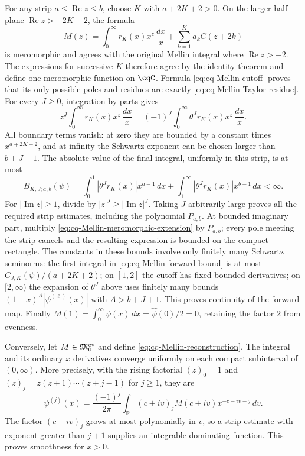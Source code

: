 For any strip $a\leq\operatorname{Re}z\leq b$, choose $K$
with $a+2K+2>0$. On the larger half-plane
$\operatorname{Re}z>-2K-2$, the formula
\begin{equation}\label{eq:cq-Mellin-meromorphic-extension}
 M(z)=\int_0^\infty r_K(x)x^z\,\frac{dx}{x}
                     +\sum_{k=1}^K a_k C(z+2k)
\end{equation}
is meromorphic and agrees with the original Mellin integral where
$\operatorname{Re}z>-2$. The expressions for successive $K$
therefore agree by the identity theorem and define one meromorphic
function on $\cqC$. Formula \eqref{eq:cq-Mellin-cutoff} proves
that its only possible poles and residues are exactly
\eqref{eq:cq-Mellin-Taylor-residue}.
For every $J\geq0$, integration by parts gives
\[
 z^J\int_0^\infty r_K(x)x^z\,\frac{dx}{x}
       =(-1)^J\int_0^\infty\theta^Jr_K(x)x^z\,\frac{dx}{x}.
\]
All boundary terms vanish: at zero they are bounded by a constant
times $x^{a+2K+2}$, and at infinity the Schwartz exponent can
be chosen larger than $b+J+1$. The absolute value of the final
integral, uniformly in this strip, is at most
\begin{equation}\label{eq:cq-Mellin-forward-bound}
 B_{K,J;a,b}(\psi)=
 \int_0^1|\theta^Jr_K(x)|x^{a-1}\,dx
 +\int_1^\infty|\theta^Jr_K(x)|x^{b-1}\,dx<\infty.
\end{equation}
For $|\operatorname{Im}z|\geq1$, divide by $|z|^J\geq
|\operatorname{Im}z|^J$. Taking $J$ arbitrarily large proves
all the required strip estimates, including the polynomial
$P_{a,b}$. At bounded imaginary part, multiply
\eqref{eq:cq-Mellin-meromorphic-extension} by $P_{a,b}$;
every pole meeting the strip cancels and the resulting expression
is bounded on the compact rectangle. The constants in these
bounds involve only finitely many Schwartz seminorms:
the first integral in \eqref{eq:cq-Mellin-forward-bound} is
at most $C_{J,K}(\psi)/(a+2K+2)$; on $[1,2]$ the cutoff
has fixed bounded derivatives; on $[2,\infty)$ the expansion
of $\theta^J$ above uses finitely many bounds
$(1+x)^A|\psi^{(\ell)}(x)|$ with $A>b+J+1$.
This proves continuity of the forward map.
Finally $M(1)=\int_0^\infty\psi(x)\,dx
=\widehat\psi(0)/2=0$, retaining the factor $2$ from evenness.

Conversely, let $M\in\mathfrak M_0^{\rm ev}$ and define
\eqref{eq:cq-Mellin-reconstruction}. The integral and its
ordinary $x$ derivatives converge uniformly on each compact
subinterval of $(0,\infty)$. More precisely, with the rising
factorial $(z)_0=1$ and
$(z)_j=z(z+1)\cdots(z+j-1)$ for $j\geq1$, they are
\begin{equation}\label{eq:cq-Mellin-differentiated-inverse}
 \psi^{(j)}(x)=\frac{(-1)^j}{2\pi}
       \int_{\mathbb R}(c+iv)_jM(c+iv)x^{-c-iv-j}\,dv.
\end{equation}
The factor $(c+iv)_j$ grows at most polynomially in $v$,
so a strip estimate with exponent greater than $j+1$ supplies
an integrable dominating function. This proves smoothness for $x>0$.

